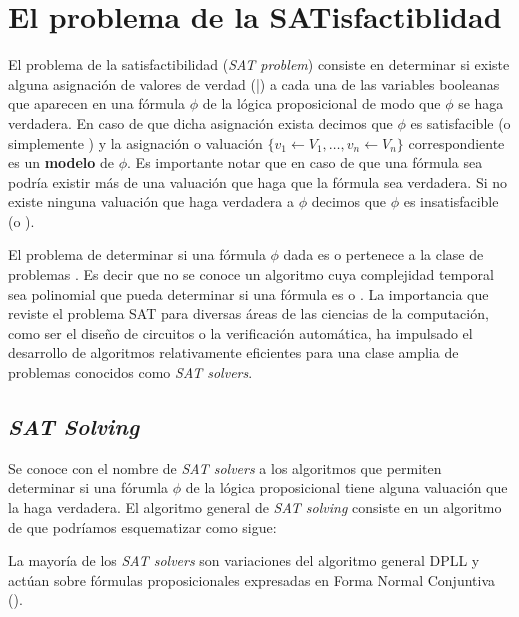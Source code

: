 
\newcommand{\disj}[1]{\ensuremath{[#1]}}
\newcommand{\conj}[1]{\ensuremath{\{#1\}}}

\section{El problema de la SATisfactiblidad}

El problema de la satisfactibilidad (\emph{SAT problem}) consiste en determinar
si existe alguna asignación de valores de verdad (\true|\false) a cada una de
las variables booleanas que aparecen en una fórmula $\phi$ de la lógica
proposicional de modo que $\phi$ se haga verdadera. En caso de que dicha
asignación exista decimos que $\phi$ es satisfacible (o simplemente \sat) y la
asignación o valuación $\{ v_1 \leftarrow V_1, \ldots, v_n \leftarrow V_n \}$
correspondiente es un \textbf{modelo} de $\phi$. Es importante notar que en caso
de que una fórmula sea \sat podría existir más de una valuación que haga que la
fórmula sea verdadera. Si no existe ninguna valuación que haga verdadera a
$\phi$ decimos que $\phi$ es insatisfacible (o \unsat).

El problema de determinar si una fórmula $\phi$ dada es \sat o \unsat pertenece
a la clase de problemas \npc\cite{Cook:1971:CTP:800157.805047}. Es decir que no
se conoce un algoritmo cuya complejidad temporal sea polinomial que pueda determinar si una fórmula es \sat
o \unsat. La importancia que reviste el problema SAT para diversas áreas de las
ciencias de la computación, como ser el diseño de circuitos o la verificación
automática, ha impulsado el desarrollo de algoritmos relativamente eficientes
para una clase amplia de problemas conocidos como \emph{SAT solvers}.

\subsection{\emph{SAT Solving}}

Se conoce con el nombre de \emph{SAT solvers} a los algoritmos que permiten
determinar si una fórumla $\phi$ de la lógica proposicional tiene alguna
valuación que la haga verdadera. El algoritmo general de  \emph{SAT solving}
consiste en un algoritmo de \bt que podríamos esquematizar como sigue:


La mayoría de los \emph{SAT solvers} son
variaciones del algoritmo general
DPLL\cite{Davis:1962:MPT:368273.368557} y actúan sobre fórmulas
proposicionales expresadas en Forma Normal Conjuntiva (\cnf).

